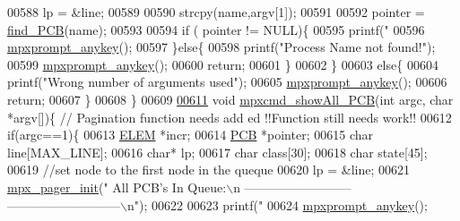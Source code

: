 \begin{DoxyCode}
{{00588                 lp = &line;
00589                 
00590                 strcpy(name,argv[1]);
00591                 
00592                 pointer = \hyperlink{mpx__r2_8c_a612a6abcb66c688a32f33abc93ff3990}{find_PCB}(name);
00593                 
00594                 \textcolor{keywordflow}{if} ( pointer != NULL)\{
00595                         printf(\textcolor{stringliteral}{"%
00596                         \hyperlink{mpx__util_8c_a338d01dfe3c80732c00450203c85b964}{mpxprompt_anykey}();
00597                 \}\textcolor{keywordflow}{else}\{
00598                         printf(\textcolor{stringliteral}{"Process Name not found!"});
00599                         \hyperlink{mpx__util_8c_a338d01dfe3c80732c00450203c85b964}{mpxprompt_anykey}();
00600                         \textcolor{keywordflow}{return};
00601                 \}
00602         \}
00603         \textcolor{keywordflow}{else}\{
00604                 printf(\textcolor{stringliteral}{"Wrong number of arguments used"});
00605                 \hyperlink{mpx__util_8c_a338d01dfe3c80732c00450203c85b964}{mpxprompt_anykey}();
00606                 \textcolor{keywordflow}{return};
00607         \}
00608 \}
00609 
\hypertarget{mpx__r2_8c_source_l00611}{}\hyperlink{mpx__r2_8h_a69559f93fe1b569abf6e846a426191a9}{00611} \textcolor{keywordtype}{void} \hyperlink{mpx__r2_8c_a69559f93fe1b569abf6e846a426191a9}{mpxcmd_showAll_PCB}(\textcolor{keywordtype}{int} argc, \textcolor{keywordtype}{char} *argv[])\{ \textcolor{comment}{// Pagination function needs add
      ed !!Function still needs work!!}
00612         \textcolor{keywordflow}{if}(argc==1)\{
00613                 \hyperlink{structpage}{ELEM} *incr;
00614                 \hyperlink{structprocess}{PCB} *pointer;
00615                 \textcolor{keywordtype}{char} line[MAX\_LINE];
00616                 \textcolor{keywordtype}{char}* lp;
00617                 \textcolor{keywordtype}{char} \textcolor{keyword}{class}[30];
00618                 \textcolor{keywordtype}{char} state[45];
00619                 \textcolor{comment}{//set node to the first node in the queque}
00620                 lp = &line;
00621                 \hyperlink{mpx__util_8c_a60afdb7496b6ff469c6b98d2ecde15ed}{mpx_pager_init}(\textcolor{stringliteral}{" All PCB's In Queue:\(\backslash\)n --------------------------
      ---------------------------\(\backslash\)n"});
00622                 
00623                 printf(\textcolor{stringliteral}{"%
00624                 \hyperlink{mpx__util_8c_a338d01dfe3c80732c00450203c85b964}{mpxprompt_anykey}();
}}}}
\end{DoxyCode}

